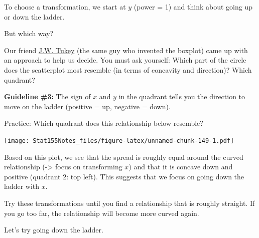 \documentclass[]{book}
\newenvironment{Shaded}{\begin{snugshade}}{\end{snugshade}}
\newcommand{\CommentTok}[1]{\textcolor[rgb]{0.56,0.35,0.01}{\textit{#1}}}
\newcommand{\DataTypeTok}[1]{\textcolor[rgb]{0.13,0.29,0.53}{#1}}
\newcommand{\DecValTok}[1]{\textcolor[rgb]{0.00,0.00,0.81}{#1}}
\newcommand{\KeywordTok}[1]{\textcolor[rgb]{0.13,0.29,0.53}{\textbf{#1}}}
\newcommand{\NormalTok}[1]{#1}
\newcommand{\OperatorTok}[1]{\textcolor[rgb]{0.81,0.36,0.00}{\textbf{#1}}}
\newcommand{\StringTok}[1]{\textcolor[rgb]{0.31,0.60,0.02}{#1}}
\begin{document}
To choose a transformation, we start at \(y\) (power = 1) and think about going up or down the ladder.

But which way?

Our friend \href{https://en.wikipedia.org/wiki/John_Tukey}{J.W. Tukey} (the same guy who invented the boxplot) came up with an approach to help us decide. You must ask yourself: Which part of the circle does the scatterplot most resemble (in terms of concavity and direction)? Which quadrant?

\textbf{Guideline \#3:} The sign of \(x\) and \(y\) in the quadrant tells you the direction to move on the ladder (positive = up, negative = down).

Practice: Which quadrant does this relationship below resemble?

\begin{Shaded}
\end{Shaded}

\texttt{[image: Stat155Notes\_files/figure-latex/unnamed-chunk-149-1.pdf]}

Based on this plot, we see that the spread is roughly equal around the curved relationship (-\textgreater{} focus on transforming \(x\)) and that it is concave down and positive (quadrant 2: top left). This suggests that we focus on going down the ladder with \(x\).

Try these transformations until you find a relationship that is roughly straight. If you go too far, the relationship will become more curved again.

Let's try going down the ladder.

\begin{Shaded}
\end{Shaded}
\end{document}
